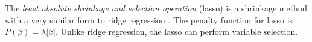 \documentclass{article}
\begin{document}

	
	The \textit{least absolute shrinkage and selection operation} (lasso) is a shrinkage method with a very similar form to ridge regression \cite{tibshirani1996regression, james2013introduction}. The penalty function for lasso is $P(\beta) = \lambda\vert \beta \vert$. Unlike ridge regression, the lasso can perform variable selection.
	

	
\end{document}

